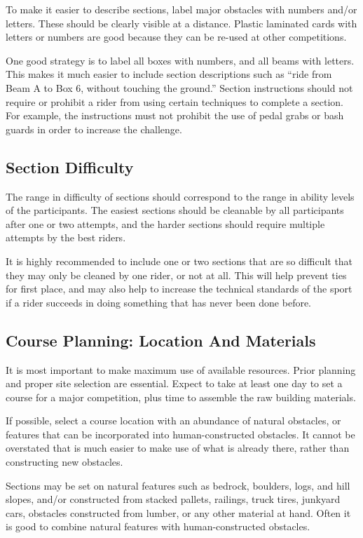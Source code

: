 To make it easier to describe sections, label major obstacles with numbers and/or letters. 
These should be clearly visible at a distance. 
Plastic laminated cards with letters or numbers are good because they can be re-used at other competitions.

One good strategy is to label all boxes with numbers, and all beams with letters. 
This makes it much easier to include section descriptions such as ``ride from Beam A to Box 6, without touching the ground.''
Section instructions should not require or prohibit a rider from using certain techniques to complete a section. 
For example, the instructions must not prohibit the use of pedal grabs or bash guards in order to increase the challenge.

\subsection{Section Difficulty}
The range in difficulty of sections should correspond to the range in ability levels of the participants. 
The easiest sections should be cleanable by all participants after one or two attempts, and the harder sections should require multiple attempts by the best riders.

It is highly recommended to include one or two sections that are so difficult that they may only be cleaned by one rider, or not at all. 
This will help prevent ties for first place, and may also help to increase the technical standards of the sport if a rider succeeds in doing something that has never been done before.

\subsection{Course Planning: Location And Materials}
It is most important to make maximum use of available resources. 
Prior planning and proper site selection are essential.
Expect to take at least one day to set a course for a major competition, plus time to assemble the raw building materials.

If possible, select a course location with an abundance of natural obstacles, or features that can be incorporated into human-constructed obstacles. 
It cannot be overstated that is much easier to make use of what is already there, rather than constructing new obstacles.

Sections may be set on natural features such as bedrock, boulders, logs, and hill slopes, and/or constructed from stacked pallets, railings, truck tires, junkyard cars, obstacles constructed from lumber, or any other material at hand. 
Often it is good to combine natural features with human-constructed obstacles.

